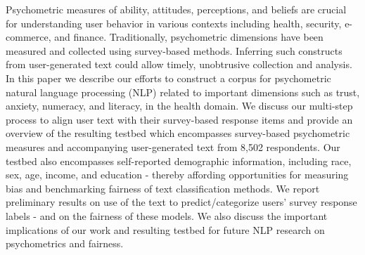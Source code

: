 Psychometric measures of ability, attitudes, perceptions, and beliefs are crucial for understanding user behavior in various contexts including health, security, e-commerce, and finance. Traditionally, psychometric dimensions have been measured and collected using survey-based methods. Inferring such constructs from user-generated text could allow timely, unobtrusive collection and analysis. In this paper we describe our efforts to construct a corpus for psychometric natural language processing (NLP) related to important dimensions such as trust, anxiety, numeracy, and literacy, in the health domain. We discuss our multi-step process to align user text with their survey-based response items and provide an overview of the resulting testbed which encompasses survey-based psychometric measures and accompanying user-generated text from 8,502 respondents. Our testbed also encompasses self-reported demographic information, including race, sex, age, income, and education - thereby affording opportunities for measuring bias and benchmarking fairness of text classification methods. We report preliminary results on use of the text to predict/categorize users' survey response labels - and on the fairness of these models. We also discuss the important implications of our work and resulting testbed for future NLP research on psychometrics and fairness.
